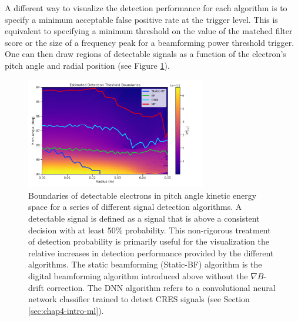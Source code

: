 
A different way to visualize the detection performance for each algorithm is to specify a minimum acceptable false positive rate at the trigger level. This is equivalent to specifying a minimum threshold on the value of the matched filter score or the size of a frequency peak for a beamforming power threshold trigger. One can then draw regions of detectable signals as a function of the electron's pitch angle and radial position (see Figure \ref{fig:chap4-estimated-detection-threshold-parameter-space}).
\begin{figure}[htbp]
    \centering
    \includegraphics*[width=0.7\textwidth]{figs/Chapter-4/220318_static_vs_bf_vs_mf_vs_dnn_detection_threshold_electron_paramter_map.png}
    \caption{\label{fig:chap4-estimated-detection-threshold-parameter-space} Boundaries of detectable electrons in pitch angle kinetic energy space for a series of different signal detection algorithms. A detectable signal is defined as a signal that is above a consistent decision with at least 50\% probability. This non-rigorous treatment of detection probability is primarily useful for the visualization the relative increases in detection performance provided by the different algorithms. The static beamforming (Static-BF) algorithm is the digital beamforming algorithm introduced above without the $\nabla B$-drift correction. The DNN algorithm refers to a convolutional neural network classifier trained to detect CRES signals (see Section \ref{sec:chap4-intro-ml}). }
\end{figure}
